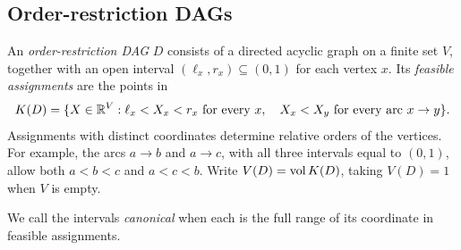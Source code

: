 \subsection{Order-restriction DAGs}\label{sec:order-dags}

An \emph{order-restriction DAG} $D$ consists of a directed acyclic graph
on a finite set $V$, together with an open interval
$(\ell_x,r_x)\subseteq(0,1)$ for each vertex $x$. Its \emph{feasible
assignments} are the points in
\begin{equation}\label{eq:node-region}
K(D)=\{X\in\mathbb R^V:\ell_x<X_x<r_x\text{ for every }x,
\quad X_x<X_y\text{ for every arc }x\to y\}.
\end{equation}
Assignments with distinct coordinates determine relative orders of the
vertices. For example, the arcs $a\to b$ and $a\to c$, with all three
intervals equal to $(0,1)$, allow both $a<b<c$ and $a<c<b$.
Write $V(D)=\operatorname{vol} K(D)$, taking $V(D)=1$ when $V$ is empty.

We call the intervals \emph{canonical} when each is the full range of
its coordinate in feasible assignments.
